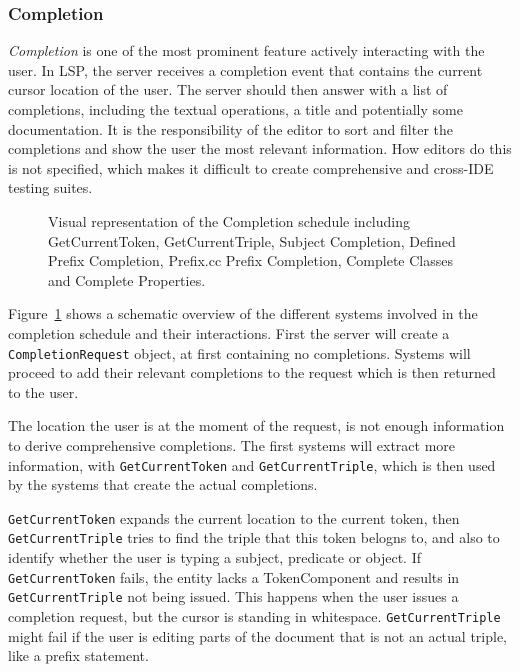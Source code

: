 \subsubsection{Completion}

\textit{Completion} is one of the most prominent feature actively interacting with the user.
In LSP, the server receives a completion event that contains the current cursor location of the user.
The server should then answer with a list of completions, including the textual operations, a title and potentially some documentation.
It is the responsibility of the editor to sort and filter the completions and show the user the most relevant information.
How editors do this is not specified, which makes it difficult to create comprehensive and cross-IDE testing suites.

\begin{figure}[!ht]
 \centering
  \caption{Visual representation of the Completion schedule including GetCurrentToken, GetCurrentTriple, Subject Completion, Defined Prefix Completion, Prefix.cc Prefix Completion, Complete Classes and Complete Properties.}\label{fig:Completion}
\end{figure}

Figure~\ref{fig:Completion} shows a schematic overview of the different systems involved in the completion schedule and their interactions.
First the server will create a \texttt{CompletionRequest} object, at first containing no completions.
Systems will proceed to add their relevant completions to the request which is then returned to the user.

The location the user is at the moment of the request, is not enough information to derive comprehensive completions. 
The first systems will extract more information, with \texttt{GetCurrentToken} and \texttt{GetCurrentTriple}, which is then used by the systems that create the actual completions.

\texttt{GetCurrentToken} expands the current location to the current token, then \texttt{GetCurrentTriple} tries to find the triple that this token belogns to, and also to identify whether the user is typing a subject, predicate or object.
If \texttt{GetCurrentToken} fails, the entity lacks a TokenComponent and results in \texttt{GetCurrentTriple} not being issued. 
This happens when the user issues a completion request, but the cursor is standing in whitespace.
\texttt{GetCurrentTriple} might fail if the user is editing parts of the document that is not an actual triple, like a prefix statement.


